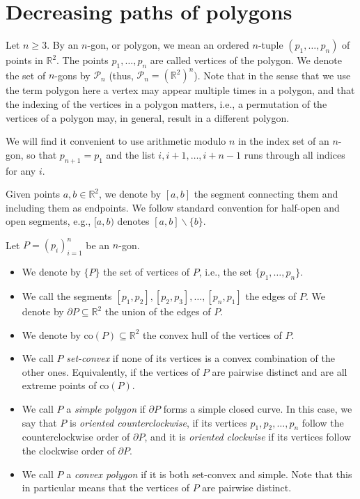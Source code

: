 \documentclass[11pt]{amsart}
\theoremstyle{remark}
\numberwithin{equation}{section}
\newcommand{\R}{\mathbb{R}}
\newcommand{\co}{\mathrm{co}}
\newcommand{\PP}{\mathcal{P}}
\renewcommand{\ge}{\geqslant}
\begin{document}
\section{Decreasing paths of polygons}\label{sec:decreasingpaths}
Let  $n\ge 3$.  By an $n$-gon, or polygon, we mean an ordered $n$-tuple $(p_1,\ldots,p_n)$ of points in $\R^2$. The points $p_1,\ldots,p_n$ are called vertices of the polygon. 
We denote the set of $n$-gons by  $\PP_n$ (thus, $\PP_n=(\R^2)^n$). Note that in the sense that we use the term polygon here a vertex may appear multiple times in a polygon, and that the indexing of the vertices in a polygon matters, i.e., a permutation of the vertices of a polygon may, in general, result in a different polygon. 

We will find it convenient to use arithmetic modulo $n$ in the index set of an $n$-gon, so that $p_{n+1}=p_1$ and  the list $i,i+1,\ldots,i+n-1$ runs through all indices for any $i$.

Given points $a,b\in \R^2$, we denote by $[a,b]$ the segment connecting them and including them as endpoints. We follow standard convention for half-open and open segments, e.g., $[a,b)$ denotes $[a,b]\backslash \{b\}$.

 
Let  $P=(p_i)_{i=1}^n$ be an $n$-gon.
\begin{itemize}
\item
We denote by $\{P\}$ the set of vertices of $P$, i.e., the set $\{p_1,\ldots,p_n\}$.  


\item
 We call the segments $[p_1,p_2],[p_2,p_3],\ldots, [p_n,p_1]$ the edges of $P$. We denote by $\partial P\subseteq \R^2$ the union of the edges of $P$.

\item 
We denote by $\co(P)\subseteq \R^2$ the convex hull of the vertices of $P$. 

\item 
 We call $P$ \emph{set-convex}  if none of its vertices is a convex combination of the other ones. Equivalently, if the vertices of $P$ are pairwise distinct 
 and are all extreme points of $\co(P)$. 
 
 \item
 We call $P$ a \emph{simple polygon} if  $\partial P$ forms a simple closed curve. In this case, we say that $P$ is \emph{oriented counterclockwise}, if its vertices
 $p_1,p_2,\ldots,p_n$ follow the counterclockwise order of $\partial P$, and it is \emph{oriented clockwise} if its vertices follow the clockwise order
 of $\partial P$.
 
 \item 
 We call $P$ a \emph{convex polygon} if it is both set-convex and simple. Note that this in particular means that the vertices of $P$ are pairwise distinct.
 \end{itemize}
\end{document}
